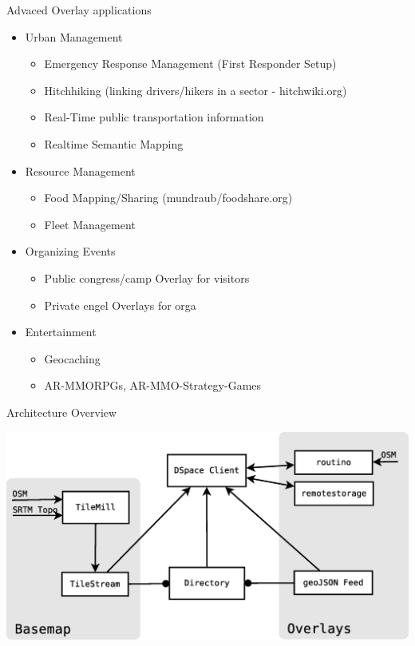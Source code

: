 \documentclass{beamer}
\begin{document}
\begin{frame}{Advaced Overlay applications}{}
 \begin{itemize}
  \item Urban Management
   \begin{itemize}
    \item Emergency Response Management (First Responder Setup)
    \item Hitchhiking (linking drivers/hikers in a sector - hitchwiki.org)
    \item Real-Time public transportation information
    \item Realtime Semantic Mapping
   \end{itemize}
  \item Resource Management
   \begin{itemize}
    \item Food Mapping/Sharing (mundraub/foodshare.org)
    \item Fleet Management
   \end{itemize}
  \item Organizing Events
   \begin{itemize}
    \item Public congress/camp Overlay for visitors
    \item Private engel Overlays for orga
   \end{itemize}
  \item Entertainment
   \begin{itemize}
    \item Geocaching
    \item AR-MMORPGs, AR-MMO-Strategy-Games
   \end{itemize}
 \end{itemize}
\end{frame}


\begin{frame}{Architecture Overview}
 \begin{center}
  \includegraphics[scale=0.35]{images/architecture.eps}
 \end{center}
\end{frame}
\end{document}

